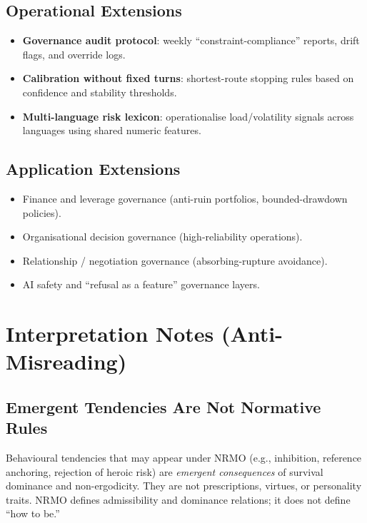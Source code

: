 \subsection{Operational Extensions}
\label{sec:foundations-8-2-operational-extensions}

\begin{itemize}
\item \textbf{Governance audit protocol}: weekly
``constraint-compliance'' reports, drift flags, and override logs.
\item \textbf{Calibration without fixed turns}: shortest-route
stopping rules based on confidence and stability thresholds.
\item \textbf{Multi-language risk lexicon}: operationalise
load/volatility signals across languages using shared numeric
features.
\end{itemize}

\subsection{Application Extensions}
\label{sec:foundations-8-3-application-extensions}

\begin{itemize}
\item Finance and leverage governance (anti-ruin portfolios,
bounded-drawdown policies).
\item Organisational decision governance (high-reliability
operations).
\item Relationship / negotiation governance (absorbing-rupture
avoidance).
\item AI safety and ``refusal as a feature'' governance layers.
\end{itemize}

\section{Interpretation Notes (Anti-Misreading)}
\label{sec:foundations-9-interpretation-notes}

\subsection{Emergent Tendencies Are Not Normative Rules}
\label{sec:foundations-9-1-emergent-tendencies}

Behavioural tendencies that may appear under NRMO (e.g., inhibition,
reference anchoring, rejection of heroic risk) are \emph{emergent
consequences} of survival dominance and non-ergodicity. They are not
prescriptions, virtues, or personality traits. NRMO defines
admissibility and dominance relations; it does not define ``how to
be.''

